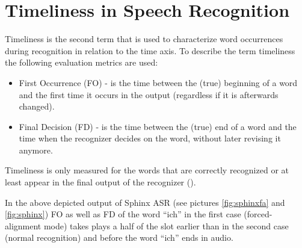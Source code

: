 \section {Timeliness in Speech Recognition} 
Timeliness is the second term that is used to characterize word
occurrences during recognition in relation to the time axis. 
To describe the term timeliness the following evaluation metrics are used:
\begin{itemize}
  \item First Occurrence (FO) - is the time between the (true) beginning of a
  word and the first time it occurs in the output (regardless if it is afterwards changed).
\item Final Decision (FD) - is the time between the (true) end of a word and the
time when the recognizer decides on the word, without later revising it anymore.
\end{itemize}

Timeliness is only measured for the words that are correctly recognized or
at least appear in the final output of the recognizer  (\parencite
{Baumann2016}).

In the above depicted output of Sphinx ASR  (see pictures \ref {fig:sphinxfa}
and \ref {fig:sphinx}) FO as well as FD of the word ``ich''  in the first case (forced-alignment mode)
takes plays a half of the slot earlier than in the second case (normal
recognition) and before the word ``ich'' ends in audio. 





 

 
